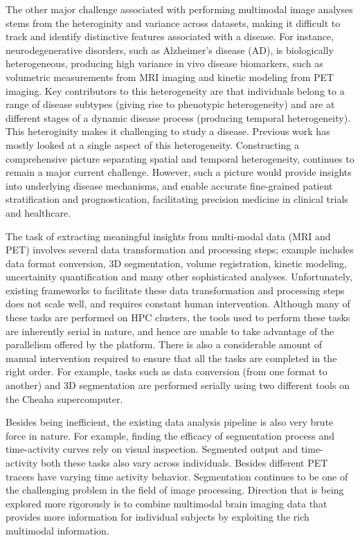 \documentclass[11pt]{article}
\begin{document}
The other major challenge associated with performing multimodal image analyses stems from the heteroginity and variance across datasets, making it difficult to track and identify distinctive features associated with a disease. For instance, neurodegenerative disorders, such as Alzheimer’s disease (AD), is biologically heterogeneous, producing high variance in vivo disease biomarkers, 
such as volumetric measurements from MRI imaging and kinetic modeling from PET imaging. Key contributors to this heterogeneity are that individuals belong to a range of disease subtypes (giving rise to phenotypic heterogeneity) and are at different stages of a dynamic disease process (producing temporal heterogeneity). This heteroginity makes it challenging to study a disease.
Previous work has mostly looked at a single aspect of this heterogeneity. Constructing a comprehensive picture separating spatial and temporal heterogeneity, continues to remain a major current challenge. However, such a picture would provide insights into underlying disease mechanisms, and enable accurate fine-grained patient stratification and prognostication, facilitating precision medicine in clinical trials and healthcare.

The task of extracting meaningful insights from multi-modal data (MRI and PET) involves several data transformation and processing steps;
example includes data format conversion, 3D segmentation, volume registration, kinetic modeling, uncertainity quantification and many other sophisticated analyses.
Unfortunately, existing frameworks to facilitate these data transformation and processing steps does not scale well, and requires constant human intervention.
Although many of these tasks are performed on HPC clusters, the tools used to perform these tasks are inherently serial in nature, and hence are unable to take advantage of the parallelism offered by the platform. There is also a considerable amount of manual intervention required to ensure that all the tasks are completed in the right order.
For example, tasks such as data conversion (from one format to another) and 3D segmentation are performed serially using two different tools on the Cheaha supercomputer.


Besides being inefficient, the existing data analysis pipeline is also very brute force in nature. 
For example, finding the efficacy of segmentation process and time-activity curves rely on visual inspection.
Segmented output and time-activity both these tasks also vary across individuals. Besides different PET tracers have varying time activity behavior.
Segmentation continues to be one of the challenging problem in the field of image processing. Direction that is being explored more rigorously is 
to combine multimodal brain imaging data that provides more information for individual subjects by exploiting the rich multimodal information.
\end{document}
